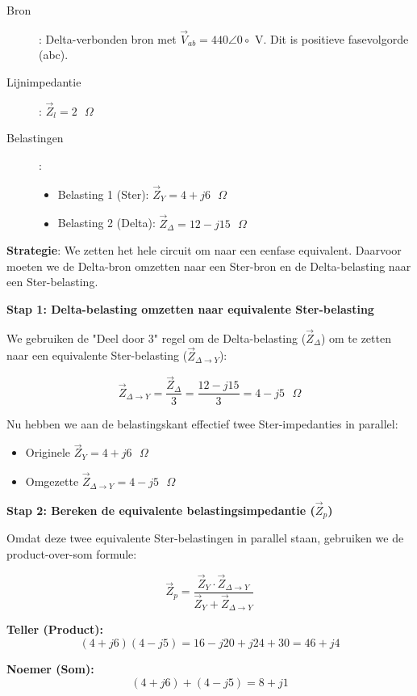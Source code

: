 \documentclass[a4paper,11pt]{article}
\begin{document}
\begin{oefenblok}

\begin{description}
    \item[Bron]: Delta-verbonden bron met $\vec{V}_{ab} = 440\angle{0\circ}$ V. Dit is positieve fasevolgorde (abc).
    \item[Lijnimpedantie]: $\vec{Z}_l = 2 \text{ } \Omega$
    \item[Belastingen]:
    \begin{itemize}
        \item Belasting 1 (Ster): $\vec{Z}_Y = 4 + j6 \text{ } \Omega$
        \item Belasting 2 (Delta): $\vec{Z}_\Delta = 12 - j15 \text{ } \Omega$
    \end{itemize}
\end{description}

\textbf{Strategie}: We zetten het hele circuit om naar een eenfase equivalent. Daarvoor moeten we de Delta-bron omzetten naar een Ster-bron en de Delta-belasting naar een Ster-belasting.

\textbf{Stap 1: Delta-belasting omzetten naar equivalente Ster-belasting}

We gebruiken de "Deel door 3" regel om de Delta-belasting ($\vec{Z}_\Delta$) om te zetten naar een equivalente Ster-belasting ($\vec{Z}_{\Delta \to Y}$):

$$\vec{Z}_{\Delta \to Y} = \frac{\vec{Z}_\Delta}{3} = \frac{12 - j15}{3} = 4 - j5 \text{ } \Omega$$

Nu hebben we aan de belastingskant effectief twee Ster-impedanties in parallel:
\begin{itemize}
    \item Originele $\vec{Z}_Y = 4 + j6 \text{ } \Omega$
    \item Omgezette $\vec{Z}_{\Delta \to Y} = 4 - j5 \text{ } \Omega$
\end{itemize}

\textbf{Stap 2: Bereken de equivalente belastingsimpedantie ($\vec{Z}_p$)}

Omdat deze twee equivalente Ster-belastingen in parallel staan, gebruiken we de product-over-som formule:

$$\vec{Z}_p = \frac{\vec{Z}_Y \cdot \vec{Z}_{\Delta \to Y}}{\vec{Z}_Y + \vec{Z}_{\Delta \to Y}}$$

\textbf{Teller (Product):}
$$(4+j6)(4-j5) = 16 - j20 + j24 + 30 = 46 + j4$$

\textbf{Noemer (Som):}
$$(4+j6) + (4-j5) = 8 + j1$$


\end{oefenblok}
\end{document}
